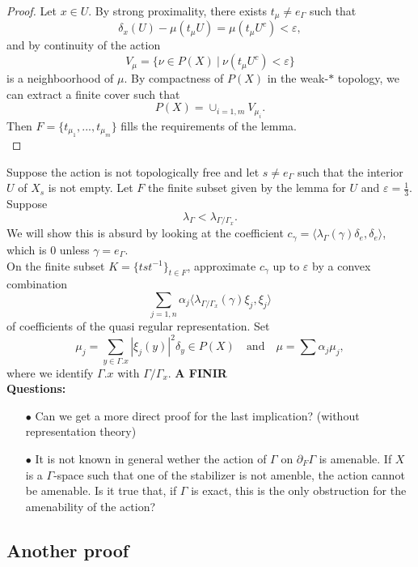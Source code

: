 \begin{proof} 
Let $x\in U$. By strong proximality, there exists $t_\mu \neq e_\Gamma$ such that
\[\delta_x(U) - \mu(t_\mu U) = \mu(t_\mu U^c)<\varepsilon,\]
and by continuity of the action 
\[V_\mu = \{\nu\in P(X)\ | \ \nu(t_\mu U^c)< \varepsilon \}\]
is a neighboorhood of $\mu$. By compactness of $P(X)$ in the weak-$*$ topology, we can extract a finite cover such that 
\[P(X) = \cup_{i=1,m} V_{\mu_i}.\]
Then $F= \{ t_{\mu_1}, ..., t_{\mu_m}\}$ fills the requirements of the lemma.\\ 
\end{proof}

Suppose the action is not topologically free and let $s\neq e_\Gamma$ such that the interior $U$ of $X_s$ is not empty. Let $F$ the finite subset given by the lemma for $U$ and $\varepsilon = \frac{1}{3}$. Suppose 
\[\lambda_{\Gamma} < \lambda_{\Gamma / \Gamma_x}.\]
We will show this is absurd by looking at the coefficient $c_\gamma=\langle \lambda_\Gamma (\gamma)\delta_e , \delta_e \rangle$, which is $0$ unless $\gamma = e_\Gamma$.\\

On the finite subset $K= \{ tst^{-1} \}_{t\in F}$, approximate $c_\gamma$ up to $\varepsilon$ by a convex combination
\[ \sum_{j=1,n} \alpha_j \langle \lambda_{\Gamma / \Gamma_x} (\gamma)\xi_j , \xi_j \rangle\] 
of coefficients of the quasi regular representation.
Set 
\[\mu_j = \sum_{y \in \Gamma .x} |\xi_j(y)|^2 \delta_y \in P(X) \quad \text{and} \quad \mu = \sum \alpha_j \mu_j,\]
where we identify $\Gamma. x $ with $\Gamma / \Gamma_x$. \textbf{A FINIR}\\

\textbf{Questions:}\\
\begin{itemize}
\item[$\bullet$] Can we get a more direct proof for the last implication? (without representation theory) \\

\item[$\bullet$] It is not known in general wether the action of $\Gamma$ on $\partial_F \Gamma$ is amenable. If $X$ is a $\Gamma$-space such that one of the stabilizer is not amenble, the action cannot be amenable. Is it true that, if $\Gamma$ is exact, this is the only obstruction for the amenability of the action?
\end{itemize}

\subsection{Another proof}

